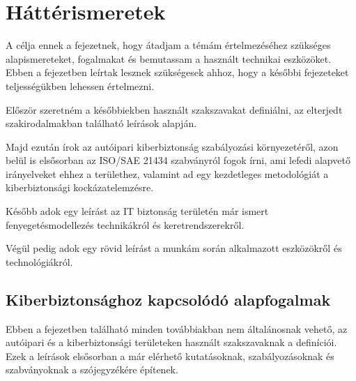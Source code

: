 \chapter{Háttérismeretek}

A célja ennek a fejezetnek, hogy átadjam a témám értelmezéséhez szükséges alapismereteket, fogalmakat és bemutassam a használt technikai eszközöket. Ebben a fejezetben leírtak lesznek szükségesek ahhoz, hogy a későbbi fejezeteket teljességükben lehessen értelmezni.

Először szeretném a későbbiekben használt szakszavakat definiálni, az elterjedt szakirodalmakban található leírások alapján. 

Majd ezután írok az autóipari kiberbiztonság szabályozási környezetéről, azon belül is elsősorban az ISO/SAE 21434 szabványról fogok írni, ami lefedi alapvető irányelveket ehhez a területhez, valamint ad egy kezdetleges metodológiát a kiberbiztonsági kockázatelemzésre.

Később adok egy leírást az IT biztonság területén már ismert fenyegetésmodellezés technikákról és keretrendszerekről.

Végül pedig adok egy rövid leírást a munkám során alkalmazott eszközökről és technológiákról.

\section{Kiberbiztonsághoz kapcsolódó alapfogalmak}

Ebben a fejezetben található minden továbbiakban nem általánosnak vehető, az autóipari és a kiberbiztonsági területeken használt szakszavaknak a definíciói. Ezek a leírások elsősorban a már elérhető kutatásoknak, szabályozásoknak és szabványoknak a szójegyzékére építenek.

